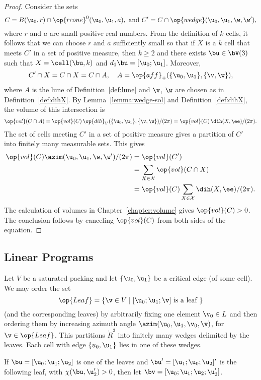 \begin{proof} 
  Consider the sets
\[
C=B(\u_0,r)\cap \op{rcone}^0(\u_0,\u_1,a),\text{ and } C' = C\cap \op{wedge}(\u_0,\u_1,\w,\w') ,
\]
 where
  $r$ and $a$ are small positive real numbers.  From the definition of
  $k$-cells, it follows that we can choose $r$ and $a$ sufficiently
  small so that if $X$ is a $k$ cell that meets $C'$ in a set of
  positive measure, then $k\ge 2$ and there exists $\bu\in \bV(3)$
  such that $X=\cell(\bu,k)$ and $d_1\bu=[\u_0;\u_1]$.  Moreover,
\[
C'\cap X = C\cap X = C\cap A, \quad A=\op{aff}_+(\{\u_0,\u_1\},\{\v,\w\}),
\]
where $A$ is the lune of Definition~\ref{def:lune} and $\v$, $\w$ are
chosen as in Definition~\ref{def:dihX}.  By
Lemma~\ref{lemma:wedge-sol} and Definition~\ref{def:dihX}, the volume
of this intersection is
\[
\op{vol}(C\cap A) = \op{vol}(C)\,
 {\op{dih}_V(\{\u_0,\u_1\},\{\v,\w\}) }/{(2\pi)} =
  \op{vol}(C)\, {\dih(X,\ee)}/{(2\pi)}.
\]
The set of cells meeting $C'$ in a set of positive measure gives a 
partition of $C'$ into finitely many measurable sets.
This gives
\begin{align*}
\op{vol}(C) \azim(\u_0,\u_1,\w,\w')/(2\pi) &= 
\op{vol}(C') \\
&= \sum_{X\in\cX} \op{vol}(C\cap X)  \\
&= \op{vol}(C)\sum_{X\in\cX} \dih(X,\ee)/(2\pi).
\end{align*}
The calculation of volumes in Chapter~\ref{chapter:volume} gives
$\op{vol}(C)>0$.  The conclusion follows by canceling $\op{vol}(C)$
from both sides of the equation.
\end{proof}


\subsection{Linear Programs}

Let $V$ be a saturated packing and let $\{\u_0,\u_1\}$ be a critical edge (of some cell).
We may order the set 
\[
\op{Leaf} = \{ \v\in V \mid [\u_0;\u_1;\v] \text{ is a leaf } \}
\]
(and the corresponding leaves)
by arbitrarily fixing one element $\v_0\in L$ and then ordering them by increasing
azimuth angle $\azim(\u_0,\u_1,\v_0,\v)$, for $\v\in \op{Leaf}$.  This partitions $\ring{R}^3$ into
finitely many wedges delimited by the leaves.  Each cell with edge $\{u_0,\u_1\}$ lies in one of these
wedges.    

If  $\bu=[\u_0;\u_1;\u_2]$ is one of the leaves and $\bu'=[\u_1;\u_0;\u_2]'$ is the following leaf, 
with $\chi(\bu,\u_2')>0$, then let $\bv = [\u_0;\u_1;\u_2;\u_2']$.

